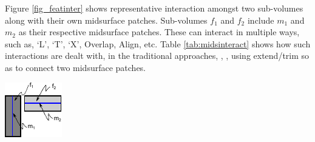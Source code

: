 \bigskip

\begin{minipage}[c]{\linewidth}
    \begin{minipage}[c]{0.63\linewidth}
 Figure \ref{fig_featinter}  shows representative interaction amongst two sub-volumes along with their own midsurface patches. Sub-volumes $f_1$ and $f_2$ include $m_1$ and $m_2$ as their respective midsurface patches. These can interact in multiple ways, such as, `L', `T', `X', Overlap, Align, etc.
Table \ref{tab:midsinteract} shows how such interactions are dealt with, in the traditional approaches\cite{Rezayat1996}, \cite{Woo2014}, \cite{Boussuge2013}, \cite{Boussuge2013a} using extend/trim so as to connect two midsurface patches. 
    \end{minipage}
    \hfill
    \begin{minipage}[c]{0.37\linewidth}
	\centering 
	\includegraphics[width=0.65\linewidth]{../Common/images/FeatureInteraction_nonAbel.pdf}
	\label{fig_featinter}
    \end{minipage}

\end{minipage}    

\bigskip



